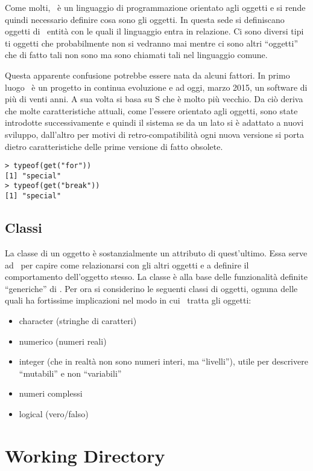 Come molti, \erre\ è un linguaggio di programmazione orientato agli oggetti e si rende quindi necessario definire cosa sono gli oggetti. In questa sede si definiscano oggetti di \erre\ entità con le quali il linguaggio entra in relazione. Ci sono diversi tipi ti oggetti che probabilmente non si vedranno mai mentre ci sono altri ``oggetti'' che di fatto tali non sono ma sono chiamati tali nel linguaggio comune.

Questa apparente confusione potrebbe essere nata da alcuni fattori. In primo luogo \erre\ è un progetto in continua evoluzione e ad oggi, marzo 2015, un software di più di venti anni. A sua volta si basa su S che è molto più vecchio. Da ciò deriva che molte caratteristiche attuali, come l'essere orientato agli oggetti, sono state introdotte successivamente e quindi il sistema se da un lato si è adattato a nuovi sviluppo, dall'altro per motivi di retro-compatibilità ogni nuova versione si porta dietro caratteristiche delle prime versione di fatto obsolete.
\begin{lstlisting}
> typeof(get("for"))
[1] "special"
> typeof(get("break"))
[1] "special"
\end{lstlisting}

\subsection{Classi}

La classe di un oggetto è sostanzialmente un attributo di quest'ultimo. Essa serve ad \erre\ per capire come relazionarsi con gli altri oggetti e a definire il comportamento dell'oggetto stesso. La classe è alla base delle funzionalità definite ``generiche''  di \erre.
%
Per ora si considerino le seguenti classi di oggetti, ognuna delle quali ha fortissime implicazioni nel modo in cui \erre\ tratta gli oggetti:

\begin{itemize}
\item character (stringhe di caratteri)
\item numerico (numeri reali)
\item integer (che in realtà non sono numeri interi, ma ``livelli''), utile per descrivere ``mutabili'' e non ``variabili''
\item numeri complessi
\item logical (vero/falso)
\end{itemize}

\section{Working Directory}


